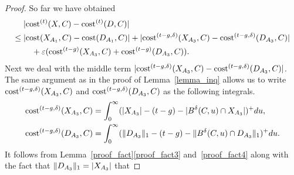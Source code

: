 \documentclass[11pt,letterpaper]{article}
\theoremstyle{definition}
\newcommand{\eps}{\varepsilon}
\DeclarePairedDelimiter{\abs}{\lvert}{\rvert}
\DeclarePairedDelimiter{\norm}{\lVert}{\rVert}
\begin{document}
\begin{proof}
	So far we have obtained
	\begin{equation}\label{eqn:cost_diff_doubling}
	\begin{aligned}
		 & \abs{\cost[t](X,C)-\cost[t](D,C)}  \\
		\leq{}& \abs{\cost(X_{A_1},C)-\cost(D_{A_1},C)} + \abs{ \cost[t-g,\delta](X_{A_3},C)-\cost[t-g,\delta](D_{A_3},C)} \\
		&\quad + \eps(\cost[t-g](X_{A_3},C) + \cost[t-g](D_{A_3},C)).
	\end{aligned}
	\end{equation}
    Next we deal with the middle term $\abs{ \cost[t-g,\delta](X_{A_3},C)-\cost[t-g,\delta](D_{A_3},C)}$.
    The same argument as in the proof of Lemma~\ref{lemma_inq} allows us to write $\cost[t-g,\delta](X_{A_3},C)$ and $\cost[t-g,\delta](D_{A_3},C)$ as the following integrals.
	\begin{align*}
    	\cost[t-g,\delta](X_{A_3},C)&= \int_{0}^{\infty} (\abs{X_{A_3}} - (t-g)-\vert B^\delta(C,u)\cap X_{A_3} \vert )^+ du, \\
	    \cost[t-g,\delta] (D_{A_3},C )&=\int_0^\infty (\norm{D_{A_3}}_1 - (t-g) - \norm{B^\delta(C,u)\cap D_{A_3}}_1)^+ du.
	\end{align*}
	It follows from Lemma~\ref{proof_fact}\ref{proof_fact3} and~\ref{proof_fact4} along with the fact that $\norm{D_{A_3}}_1 = \abs{X_{A_3}}$ that
    

\end{proof}
\end{document}
